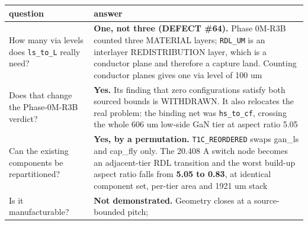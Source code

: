 \documentclass[10pt,]{article}
\begin{document}
\begin{longtable}[]{@{}ll@{}}
\toprule
\begin{minipage}[b]{0.47\columnwidth}\raggedright
question\strut
\end{minipage} & \begin{minipage}[b]{0.47\columnwidth}\raggedright
answer\strut
\end{minipage}\tabularnewline
\midrule
\endhead
\begin{minipage}[t]{0.47\columnwidth}\raggedright
How many via levels does \texttt{ls\_to\_L} really need?\strut
\end{minipage} & \begin{minipage}[t]{0.47\columnwidth}\raggedright
\textbf{One, not three (DEFECT \#64).} Phase 0M-R3B counted three
MATERIAL layers; \texttt{RDL\_UM} is an interlayer REDISTRIBUTION layer,
which is a conductor plane and therefore a capture land. Counting
conductor planes gives one via level of 100 um\strut
\end{minipage}\tabularnewline
\begin{minipage}[t]{0.47\columnwidth}\raggedright
Does that change the Phase-0M-R3B verdict?\strut
\end{minipage} & \begin{minipage}[t]{0.47\columnwidth}\raggedright
\textbf{Yes.} Its finding that zero configurations satisfy both sourced
bounds is WITHDRAWN. It also relocates the real problem: the binding net
was \texttt{hs\_to\_cf}, crossing the whole 606 um low-side GaN tier at
aspect ratio 5.05\strut
\end{minipage}\tabularnewline
\begin{minipage}[t]{0.47\columnwidth}\raggedright
Can the existing components be repartitioned?\strut
\end{minipage} & \begin{minipage}[t]{0.47\columnwidth}\raggedright
\textbf{Yes, by a permutation.} \texttt{T1C\_REORDERED} swaps gan\_ls
and cap\_fly only. The 20.408 A switch node becomes an adjacent-tier RDL
transition and the worst build-up aspect ratio falls from \textbf{5.05
to 0.83}, at identical component set, per-tier area and 1921 um
stack\strut
\end{minipage}\tabularnewline
\begin{minipage}[t]{0.47\columnwidth}\raggedright
Is it manufacturable?\strut
\end{minipage} & \begin{minipage}[t]{0.47\columnwidth}\raggedright
\textbf{Not demonstrated.} Geometry closes at a source-bounded pitch;

\end{minipage}
\end{longtable}
\end{document}
